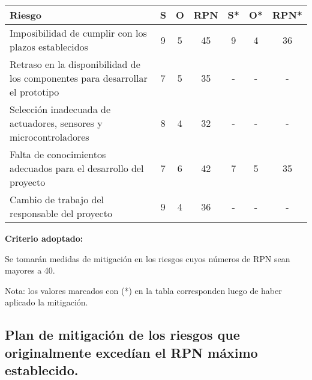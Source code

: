 \begin{table}[H]
	\centering
	\begin{tabularx}{\linewidth}{@{}|X|c|c|c|c|c|c|@{}}
		\hline
		\rowcolor[HTML]{C0C0C0}
		Riesgo                                               & S & O & RPN & S* & O* & RPN* \\ \hline
		Imposibilidad de cumplir con los plazos establecidos & 9 & 5 & 45  & 9  & 4  & 36   \\ \hline
		Retraso en la disponibilidad de los componentes para
		desarrollar el prototipo                             & 7 & 5 & 35  & -  & -  & -    \\ \hline
		Selección inadecuada de actuadores, sensores y
		microcontroladores                                   & 8 & 4 & 32  & -  & -  & -    \\ \hline
		Falta de conocimientos adecuados para el desarrollo del
		proyecto                                             & 7 & 6 & 42  & 7  & 5  & 35   \\ \hline
		Cambio de trabajo del responsable del proyecto       & 9 & 4 & 36  & -  & -  & -    \\ \hline
	\end{tabularx}%
\end{table}

\textbf{Criterio adoptado:}

Se tomarán medidas de mitigación en los riesgos cuyos números de RPN sean
mayores a 40.

Nota: los valores marcados con (*) en la tabla corresponden luego de haber
aplicado la mitigación.

\subsection{Plan de mitigación de los riesgos que originalmente excedían el RPN máximo
	establecido.}

